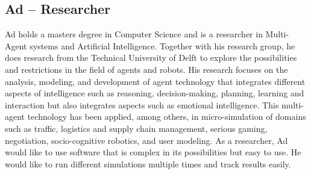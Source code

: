\subsection{Ad – Researcher}
Ad holds a masters degree in Computer Science and is a researcher in Multi-Agent systems and Artificial Intelligence. Together with his research group, he does research from the Technical University of Delft to explore the possibilities and restrictions in the field of agents and robots. His research focuses on the analysis, modeling, and development of agent technology that integrates different aspects of intelligence such as reasoning, decision-making, planning, learning and interaction but also integrates aspects such as emotional intelligence. This multi-agent technology has been applied, among others, in micro-simulation of domains such as traffic, logistics and supply chain management, serious gaming, negotiation, socio-cognitive robotics, and user modeling. 
As a researcher, Ad would like to use software that is complex in its possibilities but easy to use. He would like to run different simulations multiple times and track results easily.
